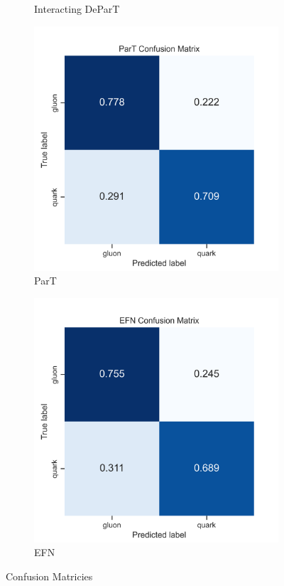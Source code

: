 \begin{figure}[!htb]
\begin{subfigure}[t]{0.38\textwidth}
		\caption{Interacting DeParT}
		\label{fig:app_cm_interacting_depart}
	\end{subfigure}
	\begin{subfigure}[t]{0.38\textwidth}
		\includegraphics[width=1\textwidth]{src/plots/results/cm/part.png}
		\caption{ParT}
		\label{fig:app_cm_part}
	\end{subfigure}
	\begin{subfigure}[t]{0.38\textwidth}
		\includegraphics[width=1\textwidth]{src/plots/results/cm/efn.png}
		\caption{EFN}
		\label{fig:app_cm_efn}
	\end{subfigure}
\caption{Confusion Matricies}
\label{fig:app_cm_5-9}
\end{figure}

